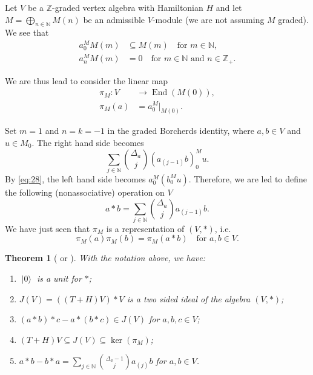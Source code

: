 \documentclass[a4paper, 12pt, reqno]{amsart}
\newtheorem{theorem}{Theorem}[section]
\theoremstyle{remark}
\numberwithin{equation}{subsection}
\DeclareMathOperator{\End}{End}
\DeclareMathOperator{\vac}{|0\rangle}
\begin{document}
Let $V$ be a $\mathbb{Z}$-graded vertex algebra with Hamiltonian $H$ and let $M = \bigoplus_{n \in \mathbb{N}}M(n)$ be an admissible $V$-module (we are not assuming $M$ graded).
We see that
\begin{equation}
  \label{eq:28}
  \begin{split}
    a^M_{0}M(m) &\subseteq M(m) \quad \text{for }m \in \mathbb{N}, \\
    a^M_{n}M(m) &= 0 \quad \text{for }m \in \mathbb{N}\text{ and }n \in \mathbb{Z}_+.
  \end{split}
\end{equation}

We are thus lead to consider the linear map
\begin{align*}
  \pi_M: V &\to \End(M(0)), \\
  \pi_M(a) &= a^M_{0}|_{M(0)}.
\end{align*}

Set $m = 1$ and $n = k = -1$ in the graded Borcherds identity, where $a, b \in V$ and $u \in M_0$.
The right hand side becomes
\begin{equation*}
  \sum_{j \in \mathbb{N}}\binom{\Delta_a}{j}(a_{(j - 1)}b)^M_0u.
\end{equation*}
By \eqref{eq:28}, the left hand side becomes $a^M_0(b^M_0u)$.
Therefore, we are led to define the following (nonassociative) operation on $V$
\begin{equation*}
  a*b = \sum_{j \in \mathbb{N}}\binom{\Delta_a}{j}a_{(j - 1)}b.
\end{equation*}
We have just seen that $\pi_M$ is a representation of $(V, *)$, i.e.\
\begin{equation}
  \label{eq:29}
  \pi_M(a)\pi_M(b) = \pi_M(a*b) \quad \text{for }a, b \in V.
\end{equation}

\begin{theorem}[{\cite[\S2]{de_sole_finite_2006} or \cite{dong_twisted_1998}}]
  \label{thr:34}
  With the notation above, we have:
  \begin{enumerate}
  \item $\vac$ is a unit for $*$;
  \item $J(V) = ((T + H)V)*V$ is a two sided ideal of the algebra $(V, *)$;
  \item $(a*b)*c - a*(b*c) \in J(V)$ for $a, b, c \in V$;
  \item $(T + H)V \subseteq J(V) \subseteq \ker(\pi_M)$;
  \item $a*b - b*a = \sum_{j \in \mathbb{N}}\binom{\Delta_a - 1}{j}a_{(j)}b$ for $a, b \in V$.
  \end{enumerate}
\end{theorem}
\end{document}
